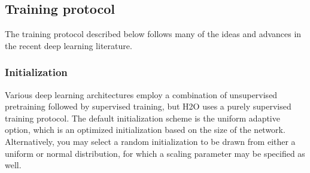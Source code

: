 \subsection{Training protocol} 
The training protocol described below follows many of the ideas and advances in the recent deep learning literature.

\subsubsection{Initialization}
\label{sssec:Initialization}
\noindent
Various deep learning architectures employ a combination of unsupervised pretraining followed by supervised training, but H2O uses a purely supervised training protocol. The default initialization scheme is the uniform adaptive option, which is an optimized initialization based on the size of the network. Alternatively, you may select a random initialization to be drawn from either a uniform or normal distribution, for which a scaling parameter may be specified as well.
